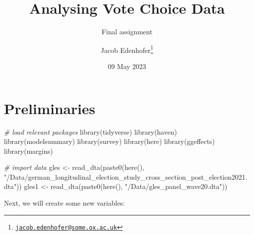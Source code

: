 \documentclass[
]{article}
\title{Analysing Vote Choice Data}
\subtitle{Final assignment}
\author{Jacob Edenhofer\footnote{\href{mailto:jacob.edenhofer@some.ox.ac.uk}{\nolinkurl{jacob.edenhofer@some.ox.ac.uk}}}}
\date{09 May 2023}
\newenvironment{Shaded}{\begin{snugshade}}{\end{snugshade}}
\newcommand{\CommentTok}[1]{\textcolor[rgb]{0.56,0.35,0.01}{\textit{#1}}}
\newcommand{\FunctionTok}[1]{\textcolor[rgb]{0.00,0.00,0.00}{#1}}
\newcommand{\NormalTok}[1]{#1}
\newcommand{\OtherTok}[1]{\textcolor[rgb]{0.56,0.35,0.01}{#1}}
\newcommand{\StringTok}[1]{\textcolor[rgb]{0.31,0.60,0.02}{#1}}
\begin{document}
\maketitle

\hypertarget{preliminaries}{%
\section{Preliminaries}\label{preliminaries}}

\begin{Shaded}
\begin{Highlighting}[]
\CommentTok{\# load relevant packages }
\FunctionTok{library}\NormalTok{(tidyverse)}
\FunctionTok{library}\NormalTok{(haven)}
\FunctionTok{library}\NormalTok{(modelsummary)}
\FunctionTok{library}\NormalTok{(survey)}
\FunctionTok{library}\NormalTok{(here)}
\FunctionTok{library}\NormalTok{(ggeffects)}
\FunctionTok{library}\NormalTok{(margins)}

\CommentTok{\# import data }
\NormalTok{gles }\OtherTok{\textless{}{-}} \FunctionTok{read\_dta}\NormalTok{(}\FunctionTok{paste0}\NormalTok{(}\FunctionTok{here}\NormalTok{(), }\StringTok{"/Data/german\_longitudinal\_election\_study\_cross\_section\_post\_election2021.dta"}\NormalTok{))}
\NormalTok{gles1 }\OtherTok{\textless{}{-}} \FunctionTok{read\_dta}\NormalTok{(}\FunctionTok{paste0}\NormalTok{(}\FunctionTok{here}\NormalTok{(), }\StringTok{"/Data/gles\_panel\_wave20.dta"}\NormalTok{))}
\end{Highlighting}
\end{Shaded}

Next, we will create some new variables:
\end{document}

